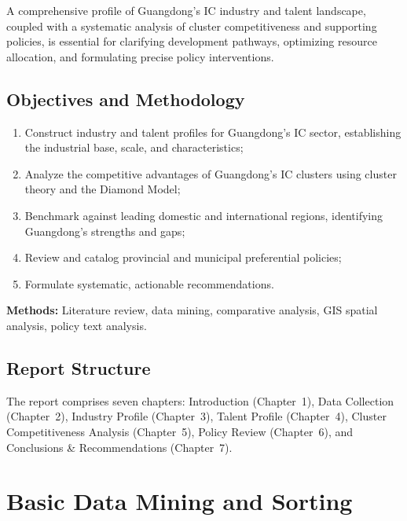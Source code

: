 \documentclass[12pt,a4paper]{article}
\begin{document}
A comprehensive profile of Guangdong's IC industry and talent landscape,
coupled with a systematic analysis of cluster competitiveness and
supporting policies, is essential for clarifying development pathways,
optimizing resource allocation, and formulating precise policy interventions.

\subsection{Objectives and Methodology}
\label{sec:objectives}

\begin{enumerate}[label=(\arabic*)]
    \item Construct industry and talent profiles for Guangdong's IC sector,
          establishing the industrial base, scale, and characteristics;
    \item Analyze the competitive advantages of Guangdong's IC clusters
          using cluster theory and the Diamond Model;
    \item Benchmark against leading domestic and international regions,
          identifying Guangdong's strengths and gaps;
    \item Review and catalog provincial and municipal preferential policies;
    \item Formulate systematic, actionable recommendations.
\end{enumerate}

\textbf{Methods:} Literature review, data mining, comparative analysis,
GIS spatial analysis, policy text analysis.

\subsection{Report Structure}
\label{sec:structure}

The report comprises seven chapters: Introduction (Chapter~1),
Data Collection (Chapter~2), Industry Profile (Chapter~3),
Talent Profile (Chapter~4), Cluster Competitiveness Analysis (Chapter~5),
Policy Review (Chapter~6), and Conclusions \& Recommendations (Chapter~7).

\section{Basic Data Mining and Sorting}
\label{sec:data}
\end{document}
